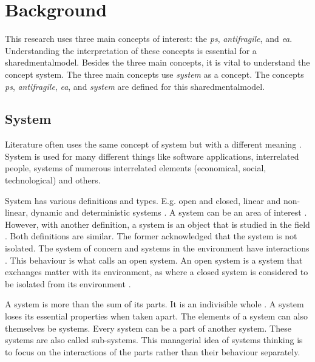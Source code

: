 \chapter{Background}
\label{ch:theoreticalbackground}
This research uses three main concepts of interest: the \textit{\gls{ps}}, \textit{\gls{antifragile}}, and \textit{\acrlong{ea}}. Understanding the interpretation of these concepts is essential for a \gls{sharedmentalmodel}. Besides the three main concepts, it is vital to understand the concept system. The three main concepts use \textit{system} as a concept. The concepts \textit{\gls{ps}}, \textit{\gls{antifragile}}, \textit{\acrlong{ea}}, and \textit{system} are defined for this \gls{sharedmentalmodel}.
\section{System}
\label{sec:tbsystem}
Literature often uses the same concept of system but with a different meaning \parencite[p.~37]{Lapalme2012}. System is used for many different things like software applications, interrelated people, systems of numerous interrelated elements (economical, social, technological) and others.

System has various definitions and types. E.g. open and closed, linear and non-linear, dynamic and deterministic systems \parencite{Rickles2007}. A system can be an area of interest \parencite[p.~13]{Mannaert2016}. However, with another definition, a system is an object that is studied in the field \parencite[p.~933]{Rickles2007}. Both definitions are similar. The former acknowledged that the system is not isolated. The system of concern and systems in the environment have interactions \parencite[p.~13--14]{Mannaert2016}. This behaviour is what \textcite[p.~32]{Bertalanffy1968} calls an open system. An open system is a system that exchanges matter with its environment, as where a closed system is considered to be isolated from its environment \parencite[p.~39]{Bertalanffy1968}.

A system is more than the sum of its parts. It is an indivisible whole \parencites[p.~51--69]{Ackoff1964}[p.~664]{Ackoff1973}. A system loses its essential properties when taken apart. The elements of a system can also themselves be systems. Every system can be a part of another system. These systems are also called sub-systems. This managerial idea of systems thinking is to focus on the interactions of the parts rather than their behaviour separately. 

